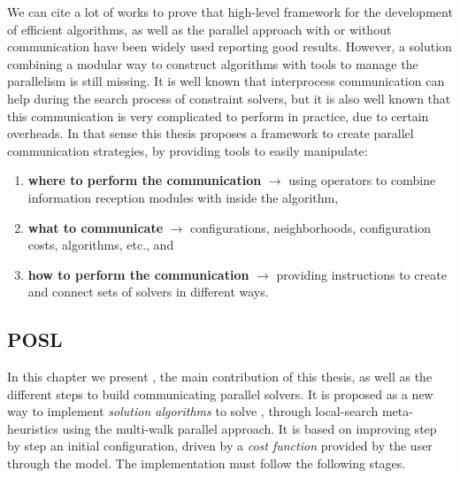 
We can cite a lot of works to prove that high-level framework for the development of efficient algorithms, as well as the parallel approach with or without communication have been widely used reporting good results. However, a solution combining a modular way to construct algorithms with tools to manage the parallelism is still missing. It is well known that interprocess communication can help during the search process of constraint solvers, but it is also well known that this communication is very complicated to perform in practice, due to certain overheads. In that sense this thesis proposes a framework to create parallel communication strategies, by providing tools to easily manipulate:
\begin{enumerate}
\item \textbf{where to perform the communication} $\rightarrow$ using operators to combine information reception modules with \cms{} inside the algorithm, 
\item \textbf{what to communicate} $\rightarrow$ configurations, neighborhoods, configuration costs, algorithms, etc., and
\item \textbf{how to perform the communication} $\rightarrow$ providing instructions to create and connect sets of solvers in different ways.
\end{enumerate}


\subsection{POSL}

In this chapter we present \posl{}, the main contribution of this thesis, as well as the different steps to build communicating parallel solvers. It is proposed as a new way to implement \textit{solution algorithms} to solve \CSPs, through local-search meta-heuristics using the multi-walk parallel approach. It is based on improving step by step an initial configuration, driven by a \textit{cost function} provided by the user through the model. The implementation must follow the following stages.

